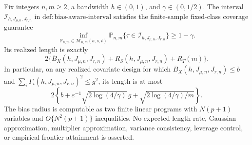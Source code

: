 Fix integers \(n,m\ge2\), a bandwidth \(h\in(0,1)\), and \(\gamma\in(0,1/2)\). The interval \(\mathcal I_{h,J_{\mu,n},J_{r,n}}\) in \(\mathrm{def:bias\text{-}aware\text{-}interval}\) satisfies the finite-sample fixed-class coverage guarantee
\[
\inf_{\mathbb P_{n,m}\in\mathcal M_{n,m}(a,s,t)}
\mathbb P_{n,m}\{\tau\in\mathcal I_{h,J_{\mu,n},J_{r,n}}\}\ge1-\gamma.
\]
Its realized length is exactly
\[
2\{\overline B_X(h,J_{\mu,n},J_{r,n})+R_S(h,J_{\mu,n},J_{r,n})+R_T(m)\}.
\]
In particular, on any realized covariate design for which \(\overline B_X(h,J_{\mu,n},J_{r,n})\le b\) and \(\sum_i\Gamma_i(h,J_{\mu,n},J_{r,n})^2\le g^2\), its length is at most
\[
2\left\{b+\varepsilon^{-1}\sqrt{2\log(4/\gamma)}\,g+\sqrt{2\log(4/\gamma)/m}\right\}.
\]
The bias radius is computable as two finite linear programs with \(N(p+1)\) variables and \(O\{N^2(p+1)\}\) inequalities. No expected-length rate, Gaussian approximation, multiplier approximation, variance consistency, leverage control, or empirical frontier attainment is asserted.